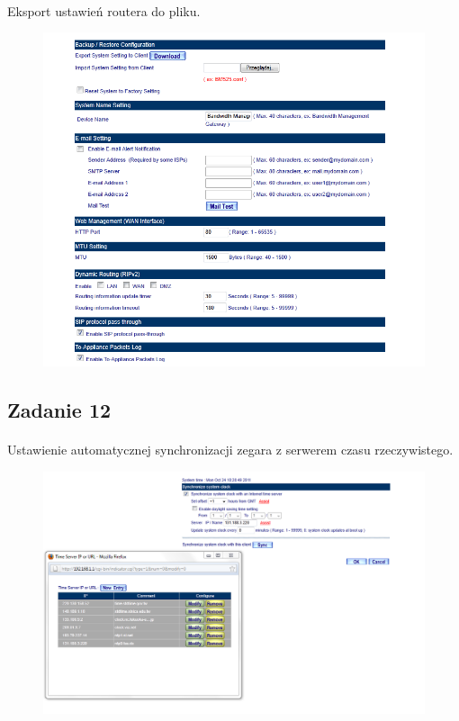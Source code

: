 \documentclass[wide,a4paper,titlepage,12pt] {article}
\begin{document}
  \paragraph{}
  Eksport ustawień routera do pliku.
  \begin{figure}[h!]
    \begin{center}
      \includegraphics[width=\textwidth]{12.PNG}
    \end{center}
  \end{figure}


  \subsection{Zadanie 12}
  \paragraph{}
  Ustawienie automatycznej synchronizacji zegara z serwerem czasu rzeczywistego.
  \begin{figure}[h!]
    \begin{center}
      \includegraphics[width=\textwidth]{14.PNG}
    \end{center}
  \end{figure}
\end{document}
